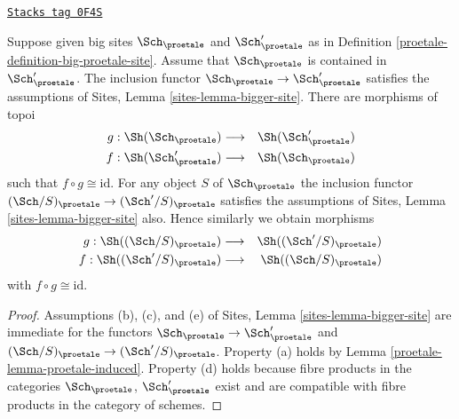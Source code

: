 \begin{lemma}
\label{proetale-lemma-change-alpha}
\href{https://stacks.math.columbia.edu/tag/0F4S}{\texttt{Stacks tag 0F4S}}

Suppose given big sites $\Sch_\proetale$ and $\Sch'_\proetale$ as in
Definition \ref{proetale-definition-big-proetale-site}.
Assume that $\Sch_\proetale$ is contained in $\Sch'_\proetale$.
The inclusion functor $\Sch_\proetale \to \Sch'_\proetale$ satisfies
the assumptions of Sites, Lemma \ref{sites-lemma-bigger-site}.
There are morphisms of topoi
\begin{eqnarray*}
g : \Sh(\Sch_\proetale) &
\longrightarrow &
\Sh(\Sch'_\proetale) \\
f : \Sh(\Sch'_\proetale) &
\longrightarrow &
\Sh(\Sch_\proetale)
\end{eqnarray*}
such that $f \circ g \cong \text{id}$. For any object $S$
of $\Sch_\proetale$ the inclusion functor
$(\Sch/S)_\proetale \to (\Sch'/S)_\proetale$ satisfies
the assumptions of Sites, Lemma \ref{sites-lemma-bigger-site}
also. Hence similarly we obtain morphisms
\begin{eqnarray*}
g : \Sh((\Sch/S)_\proetale) &
\longrightarrow &
\Sh((\Sch'/S)_\proetale) \\
f : \Sh((\Sch'/S)_\proetale) &
\longrightarrow &
\Sh((\Sch/S)_\proetale)
\end{eqnarray*}
with $f \circ g \cong \text{id}$.
\end{lemma}

\begin{proof}

Assumptions (b), (c), and (e) of
Sites, Lemma \ref{sites-lemma-bigger-site}
are immediate for the functors
$\Sch_\proetale \to \Sch'_\proetale$ and
$(\Sch/S)_\proetale \to (\Sch'/S)_\proetale$. Property (a) holds by
Lemma \ref{proetale-lemma-proetale-induced}.
Property (d) holds because
fibre products in the categories $\Sch_\proetale$, $\Sch'_\proetale$
exist and are compatible with fibre products in the category of schemes.
\end{proof}

